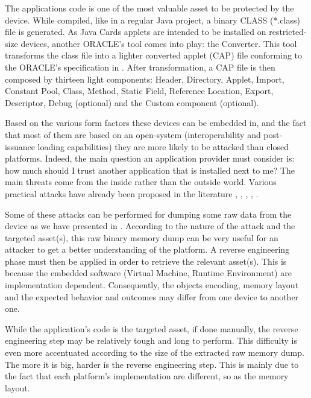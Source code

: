 The applications code is one of the most valuable asset to be protected by the device.  While
compiled, like in a regular Java project, a binary CLASS (*.class) file is generated. As Java Cards
applets are intended to be installed on restricted-size devices, another ORACLE's tool comes into
play: the Converter. This tool transforms the class file into a lighter converted applet (CAP) file
conforming to the ORACLE's specification in \cite{oraclespec3}. After transformation, a CAP file is
then composed by thirteen light components: Header, Directory, Applet, Import, Constant Pool, Class,
Method, Static Field, Reference Location, Export, Descriptor, Debug (optional) and the Custom
component (optional).

Based on the various form factors these devices can be embedded in, and the fact that most of them
are based on an open-system (interoperability and post-issuance loading capabilities) they are more
likely to be attacked than closed platforms. Indeed, the main question an application provider must
consider is: how much should I trust another application that is installed next to me? The main
threats come from the inside rather than the outside world. Various practical
attacks have already been proposed in the literature \cite{cardis15},
\cite{conf/cardis/MostowskiP08}, \cite{conf/cardis/BouffardLLL14},
\cite{conf/crisis/BouffardKLKS13}, \cite{conf/invited/RazafindralamboBICL12}.

Some of these attacks can be performed for dumping some raw data from the
device as we have presented in \cite{cardis15}.  According to the nature of the
attack and the targeted asset(s), this raw binary memory dump can be very useful
for an attacker to get a better understanding of the platform.
A reverse engineering phase must then be applied in order to retrieve the relevant asset(s). This is
because the embedded software (Virtual Machine, Runtime Environment) are implementation dependent.
Consequently, the objects encoding, memory layout and the expected behavior and outcomes may differ
from one device to another one.

    While the application's code is the targeted asset, if done manually, the reverse engineering step
may be relatively tough and long to perform. This difficulty is even more accentuated according to
the size of the extracted raw memory dump. The more it is big, harder is the reverse engineering
step.  This is mainly due to the fact that each platform's implementation are different, so as the
memory layout.  

